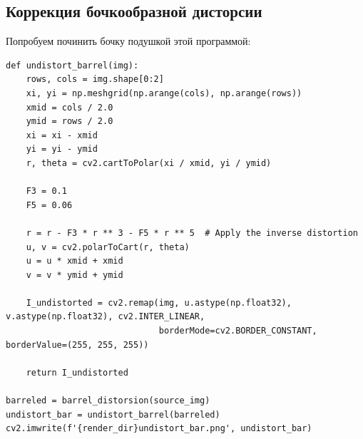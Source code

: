 \documentclass[a4paper, 16pt]{article}
\begin{document}
\subsection{Коррекция бочкообразной дисторсии}
\noindent Попробуем починить бочку подушкой этой программой:
\begin{lstlisting}[label=fixbarr-code,caption=Код для коррекции бочкообразной дисторсии]
def undistort_barrel(img):
    rows, cols = img.shape[0:2]
    xi, yi = np.meshgrid(np.arange(cols), np.arange(rows))
    xmid = cols / 2.0
    ymid = rows / 2.0
    xi = xi - xmid
    yi = yi - ymid
    r, theta = cv2.cartToPolar(xi / xmid, yi / ymid)

    F3 = 0.1
    F5 = 0.06

    r = r - F3 * r ** 3 - F5 * r ** 5  # Apply the inverse distortion
    u, v = cv2.polarToCart(r, theta)
    u = u * xmid + xmid
    v = v * ymid + ymid

    I_undistorted = cv2.remap(img, u.astype(np.float32), v.astype(np.float32), cv2.INTER_LINEAR,
                              borderMode=cv2.BORDER_CONSTANT, borderValue=(255, 255, 255))

    return I_undistorted

barreled = barrel_distorsion(source_img)
undistort_bar = undistort_barrel(barreled)
cv2.imwrite(f'{render_dir}undistort_bar.png', undistort_bar)
\end{lstlisting}
\end{document}
